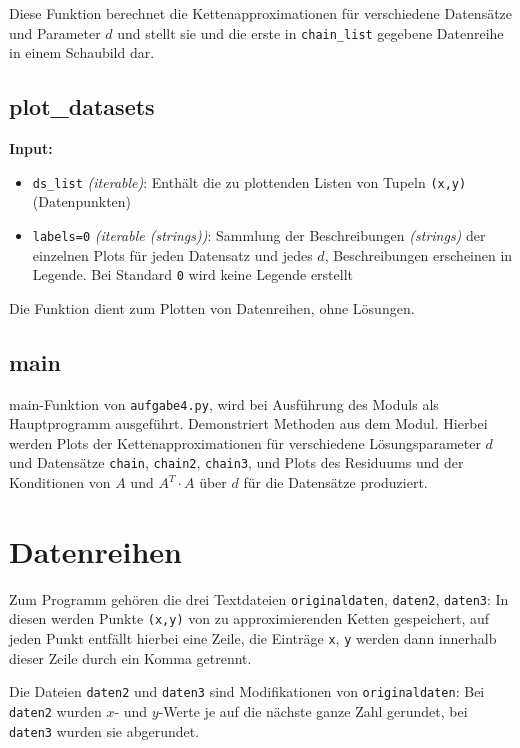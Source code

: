 \documentclass[a4paper, 11pt]{scrartcl}
\begin{document}
\noindent Diese Funktion berechnet die Kettenapproximationen für verschiedene Datensätze und Parameter $d$ und stellt sie und die erste in \texttt{chain\_list} gegebene Datenreihe in einem Schaubild dar.



\subsection{plot\_datasets}

\textbf{Input:}
\begin{itemize}
    \item \texttt{ds\_list} \textit{(iterable)}:
        Enthält die zu plottenden Listen von Tupeln \texttt{(x,y)} (Datenpunkten)
    \item \texttt{labels=0} \textit{(iterable (strings))}:
        Sammlung der Beschreibungen \textit{(strings)} der einzelnen Plots für jeden Datensatz und jedes $d$, Beschreibungen erscheinen in Legende.
        Bei Standard \texttt{0} wird keine Legende erstellt
\end{itemize}

\noindent Die Funktion dient zum Plotten von Datenreihen, ohne Lösungen.



\subsection{main}
\noindent main-Funktion von \texttt{aufgabe4.py}, wird bei Ausführung des Moduls als Hauptprogramm ausgeführt.  Demonstriert Methoden aus dem Modul. Hierbei werden Plots der Kettenapproximationen für verschiedene Lösungsparameter $d$ und Datensätze \texttt{chain}, \texttt{chain2}, \texttt{chain3}, und Plots des Residuums und der Konditionen von $A$ und $A^T \cdot A$ über $d$ für die Datensätze produziert.





\section{Datenreihen}
Zum Programm gehören die drei Textdateien \texttt{originaldaten}, \texttt{daten2}, \texttt{daten3}: In diesen werden Punkte \texttt{(x,y)} von zu approximierenden Ketten gespeichert, auf jeden Punkt entfällt hierbei eine Zeile, die Einträge \texttt{x}, \texttt{y} werden dann innerhalb dieser Zeile durch ein Komma getrennt.

Die Dateien \texttt{daten2} und \texttt{daten3} sind Modifikationen von \texttt{originaldaten}: Bei \texttt{daten2} wurden $x$- und $y$-Werte je auf die nächste ganze Zahl gerundet, bei \texttt{daten3} wurden sie abgerundet.
\end{document}
